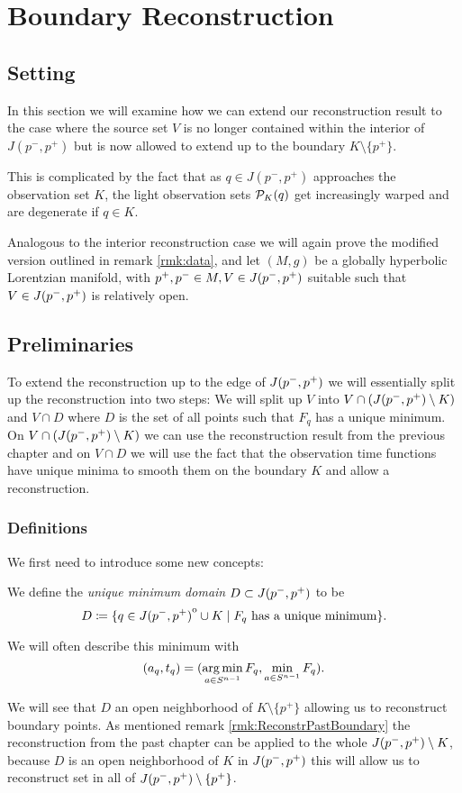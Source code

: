 \chapter{Boundary Reconstruction}\label{chap:boundary}

\section{Setting}

In this section we will examine how we can extend our reconstruction result to the case where the source set $V$ is no longer contained within the interior of $J(p^-,p^+)$ but is now allowed to extend up to the boundary $K \setminus \{p^+\}$. 

This is complicated by the fact that as $q\in J(p^-,p^+)$ approaches the observation set $K$, the light observation sets ${\mathcal{P}}_K(q)$ get increasingly warped and are degenerate if $q\in K$. 

Analogous to the interior reconstruction case we will again prove the modified version outlined in remark \ref{rmk:data}, and let $(M,g)$ be a globally hyperbolic Lorentzian manifold, with $p^+,p^-\in M,V\in J(p^-,p^+)$ suitable such that $V\in J(p^-,p^+)$ is relatively open.

\section{Preliminaries}
To extend the reconstruction up to the edge of $J(p^-,p^+)$ we will essentially split up the reconstruction into two steps: We will split up $V$ into $V\cap (J(p^-,p^+) \setminus K)$ and $V\cap D$ where $D$ is the set of all points such that $F_q$ has a unique minimum. On $V\cap (J(p^-,p^+) \setminus K)$ we can use the reconstruction result from the previous chapter and on $V\cap D$ we will use the fact that the observation time functions have unique minima to smooth them on the boundary $K$ and allow a reconstruction.

\subsection{Definitions}
We first need to introduce some new concepts:
\begin{definition}\label{def:uniquemindomain}
    We define the \emph{unique minimum domain} $D\subset J(p^-,p^+)$ to be 
    \begin{equation}
        D\coloneqq \{q\in {\kern0ptJ(p^-,p^+)}^{\mathrm{o}} \cup K \mid F_q\text{ has a unique minimum}\}.
    \end{equation}

    We will often describe this minimum with 
    \[
        (a_q,t_q)=(\operatorname*{arg\,min}_{a\in {S^{n-1}}} F_q, \min_{a\in {S^{n-1}}} F_q).
    \]
\end{definition}
We will see that $D$ an open neighborhood of $K \setminus \{p^+\}$ allowing us to reconstruct boundary points. As mentioned remark \ref{rmk:ReconstrPastBoundary} the reconstruction from the past chapter can be applied to the whole $J(p^-,p^+)\setminus K$, because $D$ is an open neighborhood of $K$ in $J(p^-,p^+)$ this will allow us to reconstruct set in all of $J(p^-,p^+)\setminus \{p^+\}$.

